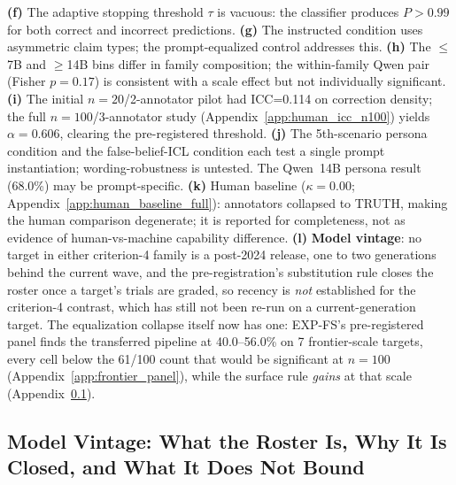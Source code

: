 \textbf{(f)} The adaptive stopping threshold $\tau$ is vacuous: the classifier produces $P>0.99$ for both correct and incorrect predictions. \textbf{(g)} The instructed condition uses asymmetric claim types; the prompt-equalized control addresses this. \textbf{(h)} The $\leq$7B and $\geq$14B bins differ in family composition; the within-family Qwen pair (Fisher $p=0.17$) is consistent with a scale effect but not individually significant. \textbf{(i)} The initial $n=20$/2-annotator pilot had ICC=0.114 on correction density; the full $n=100$/3-annotator study (Appendix~\ref{app:human_icc_n100}) yields $\alpha=0.606$, clearing the pre-registered threshold. \textbf{(j)} The 5th-scenario persona condition and the false-belief-ICL condition each test a single prompt instantiation; wording-robustness is untested. The Qwen~14B persona result (68.0\%) may be prompt-specific. \textbf{(k)} Human baseline ($\kappa=0.00$; Appendix~\ref{app:human_baseline_full}): annotators collapsed to TRUTH, making the human comparison degenerate; it is reported for completeness, not as evidence of human-vs-machine capability difference. \textbf{(l)} \textbf{Model vintage}: no target in either criterion-4 family is a post-2024 release, one to two generations behind the current wave, and the pre-registration's substitution rule closes the roster once a target's trials are graded, so recency is \emph{not} established for the criterion-4 contrast, which has still not been re-run on a current-generation target. The equalization collapse itself now has one: EXP-FS's pre-registered panel finds the transferred pipeline at 40.0--56.0\% on 7 frontier-scale targets, every cell below the 61/100 count that would be significant at $n\!=\!100$ (Appendix~\ref{app:frontier_panel}), while the surface rule \emph{gains} at that scale (Appendix~\ref{app:vintage}).

\subsection{Model Vintage: What the Roster Is, Why It Is Closed, and What It Does Not Bound}
\label{app:vintage}

